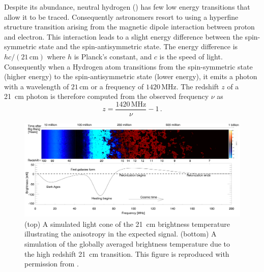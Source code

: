 \begin{bibunit}
Despite its abundance, neutral hydrogen () has few low energy transitions that allow it to
be traced.  Consequently astronomers resort to using a hyperfine structure transition arising from
the magnetic dipole interaction between proton and electron. This interaction leads to a slight
energy difference between the spin-symmetric state and the spin-antisymmetric state. The energy
difference is $hc / (21\,\text{cm})$ where $h$ is Planck's constant, and $c$ is the speed of light.
Consequently when a Hydrogen atom transitions from the spin-symmetric state (higher energy) to the
spin-antisymmetric state (lower energy), it emits a photon with a wavelength of $21\,\text{cm}$ or a
frequency of $1420\,\text{MHz}$. The redshift $z$ of a 21~cm photon is therefore computed from the
observed frequency $\nu$ as
\begin{equation}
    z = \frac{1420\,\text{MHz}}{\nu} - 1\,.
\end{equation}

\begin{figure}[t]
    \centering
    \includegraphics[width=\textwidth]{figures/chapter1/pritchard-2012-global-signal}
    \caption{
        (top) A simulated light cone of the 21~cm brightness temperature illustrating the
        anisotropy in the expected signal.
        (bottom) A simulation of the globally averaged brightness temperature due to the high
        redshift 21~cm transition.
        This figure is reproduced with permission from \citet{2012RPPh...75h6901P}.
    }
    \label{fig:pritchard-global-signal}
\end{figure}


\end{bibunit}

